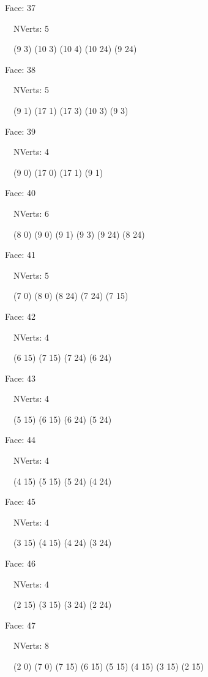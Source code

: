 \documentclass{article}
\begin{document}
{\footnotesize 

Face: 37

\   \    NVerts: 5

 \   \   (9 3) (10 3) (10 4) (10 24) (9 24)}

{\footnotesize 

Face: 38

\   \    NVerts: 5

 \   \   (9 1) (17 1) (17 3) (10 3) (9 3)}

{\footnotesize 

Face: 39

\   \    NVerts: 4

 \   \   (9 0) (17 0) (17 1) (9 1)}

{\footnotesize 

Face: 40

\   \    NVerts: 6

 \   \   (8 0) (9 0) (9 1) (9 3) (9 24) (8 24)}

{\footnotesize 

Face: 41

\   \    NVerts: 5

 \   \   (7 0) (8 0) (8 24) (7 24) (7 15)}

{\footnotesize 

Face: 42

\   \    NVerts: 4

 \   \   (6 15) (7 15) (7 24) (6 24)}

{\footnotesize 

Face: 43

\   \    NVerts: 4

 \   \   (5 15) (6 15) (6 24) (5 24)}

{\footnotesize 

Face: 44

\   \    NVerts: 4

 \   \   (4 15) (5 15) (5 24) (4 24)}

{\footnotesize 

Face: 45

\   \    NVerts: 4

 \   \   (3 15) (4 15) (4 24) (3 24)}

{\footnotesize 

Face: 46

\   \    NVerts: 4

 \   \   (2 15) (3 15) (3 24) (2 24)}

{\footnotesize 

Face: 47

\   \    NVerts: 8

 \   \   (2 0) (7 0) (7 15) (6 15) (5 15) (4 15) (3 15) (2 15)}
\end{document}
